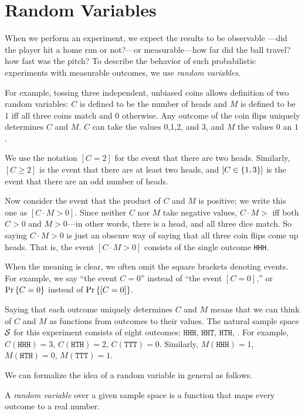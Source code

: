 \documentclass[11pt,twoside]{article}
\begin{document}

\section{Random Variables}
 
When we perform an experiment, we expect the results to be observable
---did the player hit a home run or not?---or measurable---how far did
the ball travel? how fast was the pitch?  To describe the behavior of such
probabilistic experiments with measurable outcomes, we use \emph{random
  variables}.

For example, tossing three independent, unbiased coins allows
definition of two random variables: $C$ is defined to be the number of
heads and $M$ is defined to be 1 iff all three coins match and 0
otherwise.  Any outcome of the coin flips uniquely determines $C$ and
$M$.  $C$ can take the values 0,1,2, and 3, and $M$ the values $0$ an
$1$.

We use the notation $[C = 2]$ for the event that there are two heads.
Similarly, $[C \geq 2]$ is the event that there are at least two heads,
and $[C \in \left\{1, 3\right\}]$ is the event that there are an odd number of
heads.

Now consider the event that the product of $C$ and $M$ is positive; we
write this one as $[C \cdot M >0]$.  Since neither $C$ nor $M$ take
negative values, $C\cdot M>$ iff both $C>0$ and $M>0$---in other words,
there is a head, and all three dice match.  So saying $C \cdot M >0$ is
just an obscure way of saying that all three coin flips come up heads.
That is, the event $[C \cdot M >0]$ consists of the single outcome
\texttt{HHH}.

When the meaning is clear, we often omit the square brackets denoting
events.  For example, we say ``the event $C=0$'' instead of ``the event
$[C=0]$,'' or $\mathop{\textup{Pr}}\nolimits\left\{C=0\right\}$ instead of $\mathop{\textup{Pr}}\nolimits\left\{[C=0]\right\}$.

Saying that each outcome uniquely determines $C$ and $M$ means that we can
think of $C$ and $M$ as functions from outcomes to their values.  The
natural sample space $\mathcal{S}$ for this experiment consists of eight
outcomes: $\mathtt{HHH}$, $\mathtt{HHT}$, $\mathtt{HTH}$, \etc.  For
example, $C(\mathtt{HHH}) = 3$, $C(\mathtt{HTH}) = 2$, $C(\mathtt{TTT}) =
0$.  Similarly, $M(\mathtt{HHH}) = 1$, $M(\mathtt{HTH}) = 0$,
$M(\mathtt{TTT}) = 1$.

We can formalize the idea of a random variable in general as follows.
\begin{definition}
A \emph{random variable} over a given sample space is a function that maps
every outcome to a real number.
\end{definition}
\end{document}
